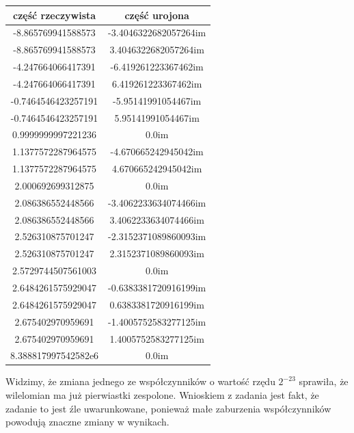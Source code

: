 \documentclass[]{article}
\begin{document}
	\begin{table}[h!]
		\centering
		\label{tab:table1}
		\begin{tabular}{|c|c|}
			\hline
			część rzeczywista & część urojona \\
			\hline
			-8.865769941588573 & -3.4046322682057264im \\ \hline
			-8.865769941588573 & 3.4046322682057264im \\ \hline
			-4.247664066417391 & -6.419261223367462im \\ \hline
			-4.247664066417391 & 6.419261223367462im \\ \hline
			-0.7464546423257191 & -5.95141991054467im \\ \hline
			-0.7464546423257191 & 5.95141991054467im \\ \hline
			0.9999999997221236 & 0.0im \\ \hline
			1.1377572287964575 & -4.670665242945042im \\ \hline
			1.1377572287964575 & 4.670665242945042im \\ \hline
			2.000692699312875 & 0.0im \\ \hline
			2.086386552448566 & -3.4062233634074466im \\ \hline
			2.086386552448566 & 3.4062233634074466im \\ \hline
			2.526310875701247 & -2.3152371089860093im \\ \hline
			2.526310875701247 & 2.3152371089860093im \\ \hline
			2.5729744507561003 & 0.0im \\ \hline
			2.6484261575929047 & -0.6383381720916199im \\ \hline
			2.6484261575929047 & 0.6383381720916199im \\ \hline
			2.675402970959691 & -1.4005752583277125im \\ \hline
			2.675402970959691 & 1.4005752583277125im \\ \hline
			8.388817997542582e6 & 0.0im \\ \hline
		\end{tabular}
	\end{table}
	
	Widzimy, że zmiana jednego ze współczynników o wartość rzędu $2^{-23}$ sprawiła, że wilelomian ma już pierwiastki zespolone. Wnioskiem z zadania jest fakt, że zadanie to jest źle uwarunkowane, ponieważ małe zaburzenia współczynników powodują znaczne zmiany w wynikach.
	
\end{document}
